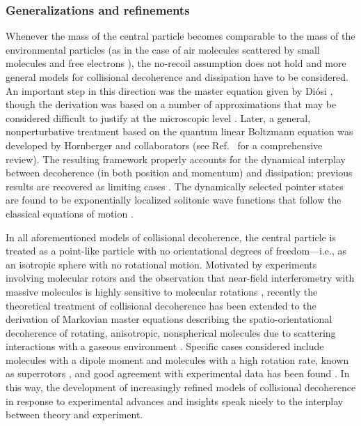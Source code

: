\documentclass[3p,sort&compress,12pt]{elsarticle}
\begin{document}
\subsubsection{Generalizations and refinements}

Whenever the mass of the central particle becomes comparable to the mass of the environmental particles (as in the case of air molecules scattered by small molecules and free electrons \cite{Tegmark:1993:uz}), the no-recoil assumption does not hold and more general models for collisional decoherence and dissipation have to be considered. An important step in this direction was the master equation given by Di{\'o}si \cite{Diosi:1995:um}, though the derivation was based on a number of approximations that may be considered difficult to justify at the microscopic level \cite{Hornberger:2008:ii}. Later, a general, nonperturbative treatment based on the quantum linear Boltzmann equation was developed by Hornberger and collaborators \cite{Hornberger:2006:tb,Hornberger:2006:tc,Hornberger:2008:ii,Busse:2009:aa,Vacchini:2009:pp,Busse:2010:aa,Busse:2010:oo} (see Ref.~\cite{Vacchini:2009:pp} for a comprehensive review). The resulting framework properly accounts for the dynamical interplay between decoherence (in both position and momentum) and dissipation; previous results are recovered as limiting cases \cite{Hornberger:2006:tb,Hornberger:2006:tc,Hornberger:2008:ii,Vacchini:2009:pp,Busse:2010:oo}. The dynamically selected pointer states are found to be exponentially localized solitonic wave functions that follow the classical equations of motion \cite{Busse:2009:aa,Busse:2010:aa}. 

In all aforementioned models of collisional decoherence, the central particle is treated as a point-like particle with no orientational degrees of freedom---i.e., as an isotropic sphere with no rotational motion. Motivated by experiments involving molecular rotors and the observation that near-field interferometry with massive molecules is highly sensitive to molecular rotations \cite{Gring:2010:aa,Stickler:2015:zz}, recently the theoretical treatment of collisional decoherence has been extended to the derivation of Markovian master equations describing the spatio-orientational decoherence of rotating, anisotropic, nonspherical molecules due to scattering interactions with a gaseous environment \cite{Walter:2016:zz,Stickler:2016:yy,Papendell:2017:yy, Stickler:2018:oo,Stickler:2018:uu}. Specific cases considered include molecules with a dipole moment \cite{Walter:2016:zz} and molecules with a high rotation rate, known as superrotors \cite{Stickler:2018:oo}, and good agreement with experimental data has been found \cite{Stickler:2018:oo}. In this way, the development of increasingly refined models of collisional decoherence in response to experimental advances and insights speak nicely to the interplay between theory and experiment. 
\end{document}
